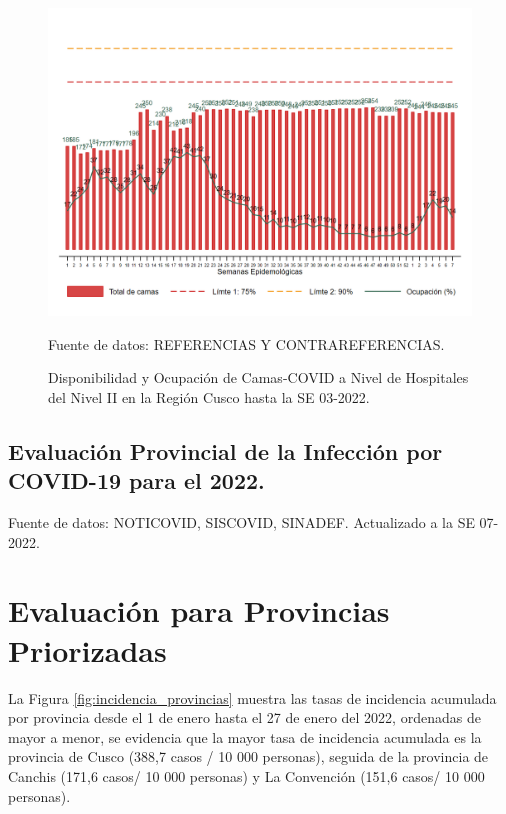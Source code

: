 \documentclass[12pt,a4paper,openany]{book}
\begin{document}
\begin{figure}[h]
	\caption{Disponibilidad y Ocupación de Camas-COVID a Nivel de Hospitales del Nivel II en la Región Cusco hasta la SE 03-2022.}\label{fig:ocupacion_2nivel}
	\begin{center}
		\includegraphics[width=0.95\linewidth]{../figuras/nivel_2.png}
	\end{center}
	{\footnotesize {Fuente de datos: REFERENCIAS Y CONTRAREFERENCIAS.}}
\end{figure}
\clearpage
\begin{landscape}
	
	\subsection*{Evaluación Provincial de la Infección por COVID-19 para el 2022.} 
	
	
	
	
	{\footnotesize Fuente de datos: NOTICOVID, SISCOVID, SINADEF. Actualizado a la SE 07-2022.}
	
	\noindent 
	
\end{landscape}


\clearpage

	\section*{Evaluación para Provincias Priorizadas}
\noindent La Figura \ref{fig:incidencia_provincias} muestra las tasas de incidencia acumulada por provincia desde el 1 de enero hasta el 27 de enero del 2022, ordenadas de mayor a menor, se evidencia que la mayor tasa de incidencia acumulada es la provincia de Cusco (388,7 casos / 10 000 personas), seguida de la provincia de Canchis (171,6 casos/ 10 000 personas)  y La Convención (151,6 casos/ 10 000 personas).
\end{document}

